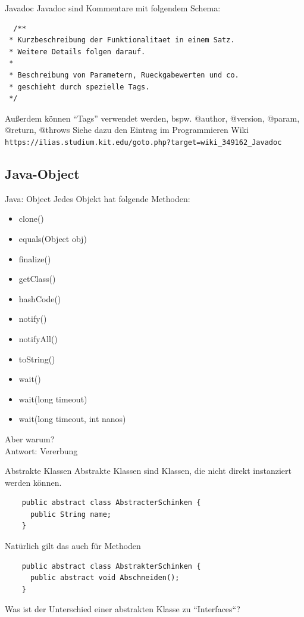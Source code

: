 \documentclass[18pt]{beamer}
\begin{document}
\begin{frame}[fragile]{Javadoc}
 Javadoc sind Kommentare mit folgendem Schema:
 \begin{lstlisting}
  /**
 * Kurzbeschreibung der Funktionalitaet in einem Satz.
 * Weitere Details folgen darauf.
 * 
 * Beschreibung von Parametern, Rueckgabewerten und co.
 * geschieht durch spezielle Tags.
 */
 \end{lstlisting}
Außerdem können ``Tags'' verwendet werden, bspw. @author, @version, @param, @return, @throws
Siehe dazu den Eintrag im Programmieren Wiki
\scriptsize
\verb|https://ilias.studium.kit.edu/goto.php?target=wiki_349162_Javadoc|
\end{frame}




\subsection{Java-Object}
\begin{frame}{Java: Object}
  \small
 Jedes Objekt hat folgende Methoden:
 \begin{itemize}
  \item clone()
  \item equals(Object obj)
  \item finalize()
  \item getClass()
  \item hashCode()
  \item notify()
  \item notifyAll()
  \item toString()
  \item wait()
  \item wait(long timeout)
  \item wait(long timeout, int nanos)
 \end{itemize}
 Aber warum? \\
 \large Antwort: Vererbung
 

\end{frame}

\begin{frame}[fragile]{Abstrakte Klassen}
 Abstrakte Klassen sind Klassen, die nicht direkt instanziert werden können.
 \begin{lstlisting}
    public abstract class AbstracterSchinken {
      public String name;
    }
 \end{lstlisting} 
 Natürlich gilt das auch für Methoden
 \begin{lstlisting}
    public abstract class AbstrakterSchinken {
      public abstract void Abschneiden();
    }
 \end{lstlisting} 
Was ist der Unterschied einer abstrakten Klasse zu ``Interfaces``?
\end{frame}
\end{document}
